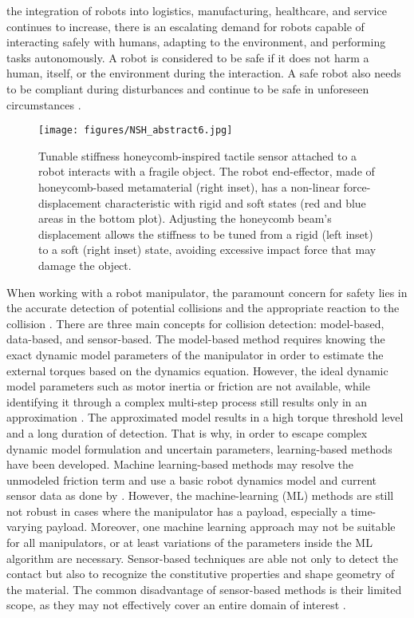 \documentclass[lettersize,journal]{IEEEtran}
\begin{document}
 the integration of robots into logistics,  manufacturing, healthcare, and service continues to increase,  there is an escalating demand for robots capable of interacting safely with humans, adapting to the environment, and performing tasks autonomously. A robot is considered to be safe if it does not harm a human, itself, or the environment during the interaction. A safe robot also needs to be compliant during disturbances and continue to be safe in unforeseen circumstances \cite{fumagalli2012force}. 
\begin{figure}[thpb]
\centering
\texttt{[image: figures/NSH\_abstract6.jpg]}
\caption {Tunable stiffness honeycomb-inspired tactile sensor attached to a robot interacts with a fragile object. The robot end-effector, made of honeycomb-based metamaterial (right inset), has a non-linear force-displacement characteristic with rigid and soft states (red and blue areas in the bottom plot). Adjusting the honeycomb beam's displacement allows the stiffness to be tuned from a rigid (left inset) to a soft (right inset) state, avoiding excessive impact force that may damage the object.
}

\label{abstract_illustration}
\end{figure}
\par When working with a robot manipulator, the paramount concern for safety lies in the accurate detection of potential collisions and the appropriate reaction to the collision \cite{haddadin2008collision} \cite{de2012integrated}. There are three main concepts for collision detection: model-based, data-based, and sensor-based. The model-based method requires knowing the exact dynamic model parameters of the manipulator in order to estimate the external torques based on the dynamics equation. However, the ideal dynamic model parameters such as motor inertia or friction are not available, while identifying it through a complex multi-step process still results only in an approximation \cite{mamedov2020practical}. The approximated model results in a high torque threshold level and a long duration of detection. That is why, in order to escape complex dynamic model formulation and uncertain parameters, learning-based methods have been developed. Machine learning-based methods may resolve the unmodeled friction term and use a basic robot dynamics model and current sensor data as done by \cite{park2020learning}. However, the machine-learning (ML) methods are still not robust in cases where the manipulator has a payload, especially a time-varying payload. Moreover, one machine learning approach may not be suitable for all manipulators, or at least variations of the parameters inside the ML algorithm are necessary. Sensor-based techniques are able not only to detect the contact but also to recognize the constitutive properties and shape geometry of the material. The common disadvantage of sensor-based methods is their limited scope, as they may not effectively cover an entire domain of interest \cite{luo2017robotic}.
\end{document}
